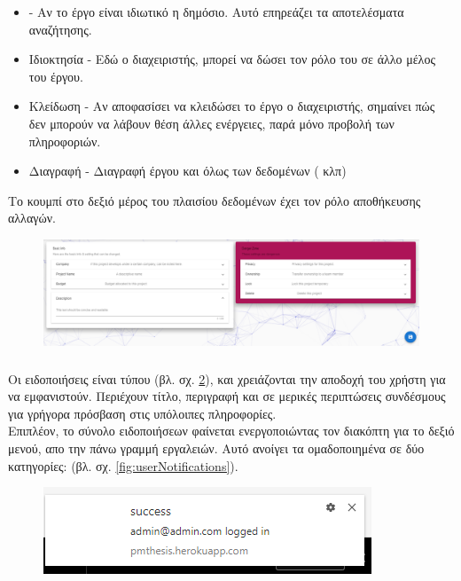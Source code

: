 \begin{itemize}
	\item {} - Αν το έργο είναι ιδιωτικό η δημόσιο. Αυτό επηρεάζει τα αποτελέσματα αναζήτησης.
	\item Ιδιοκτησία - Εδώ ο διαχειριστής, μπορεί να δώσει τον ρόλο του σε άλλο μέλος του έργου.
	\item Κλείδωση - Αν αποφασίσει να κλειδώσει το έργο ο διαχειριστής, σημαίνει πώς δεν μπορούν να λάβουν θέση άλλες ενέργειες, παρά μόνο προβολή των πληροφοριών.
	\item Διαγραφή - Διαγραφή έργου και όλως των δεδομένων ( κλπ)
\end{itemize}

\pSpace Το κουμπί στο δεξιό μέρος του πλαισίου δεδομένων έχει τον ρόλο αποθήκευσης αλλαγών.

\begin{figure}[!htb]
\includegraphics[width=\linewidth]{images/projectSettings.png}
\caption{}
\label{fig:projectSettings}
\end{figure}

\subsubsection*{}
\pSpace Οι ειδοποιήσεις είναι τύπου  (βλ. σχ. \ref{fig:pushNotification}), και χρειάζονται την αποδοχή του χρήστη για να εμφανιστούν. Περιέχουν τίτλο, περιγραφή και σε μερικές περιπτώσεις συνδέσμους για γρήγορα πρόσβαση στις υπόλοιπες πληροφορίες.\\
\pSpace Επιπλέον, το σύνολο ειδοποιήσεων φαίνεται ενεργοποιώντας τον διακόπτη για το δεξιό μενού, απο την πάνω γραμμή εργαλειών. Αυτό ανοίγει τα  ομαδοποιημένα σε δύο κατηγορίες:  (βλ. σχ. \ref{fig:userNotifications}).

\begin{figure}[!htb]
\centering
\includegraphics[scale=0.5]{images/pushNotification.png}
\caption{}
\label{fig:pushNotification}
\end{figure}

